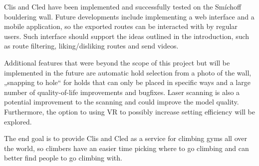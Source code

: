 Clis and Cled have been implemented and successfully tested on the Smíchoff bouldering wall.
Future developments include implementing a web interface and a mobile application, so the exported routes can be interacted with by regular users.
Such interface should support the ideas outlined in the introduction, such as route filtering, liking/disliking routes and send videos.

Additional features that were beyond the scope of this project but will be implemented in the future are automatic hold selection from a photo of the wall, „snapping to hole“ for holds that can only be placed in specific ways and a large number of quality-of-life improvements and bugfixes.
Laser scanning is also a potential improvement to the scanning and could improve the model quality.
Furthermore, the option to using VR to possibly increase setting efficiency will be explored.

The end goal is to provide Clis and Cled as a service for climbing gyms all over the world, so climbers have an easier time picking where to go climbing and can better find people to go climbing with.

